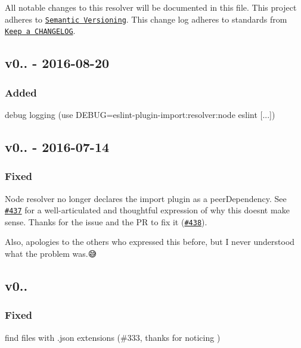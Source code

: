 All notable changes to this resolver will be documented in this file. This project adheres to \href{http://semver.org/}{\tt Semantic Versioning}. This change log adheres to standards from \href{http://keepachangelog.com}{\tt Keep a C\+H\+A\+N\+G\+E\+L\+OG}.

\subsection*{v0.. -\/ 2016-\/08-\/20}

\subsubsection*{Added}


\begin{DoxyItemize}
\item debug logging (use {\ttfamily D\+E\+B\+UG=eslint-\/plugin-\/import\+:resolver\+:node eslint \mbox{[}...\mbox{]}})
\end{DoxyItemize}

\subsection*{v0.. -\/ 2016-\/07-\/14}

\subsubsection*{Fixed}


\begin{DoxyItemize}
\item Node resolver no longer declares the import plugin as a {\ttfamily peer\+Dependency}. See \href{https://github.com/benmosher/eslint-plugin-import/issues/437}{\tt \#437} for a well-\/articulated and thoughtful expression of why this doesn\textquotesingle{}t make sense. Thanks \href{https://github.com/jasonkarns}{\tt } for the issue and the PR to fix it (\href{https://github.com/benmosher/eslint-plugin-import/pull/438}{\tt \#438}).

Also, apologies to the others who expressed this before, but I never understood what the problem was.\+😅
\end{DoxyItemize}

\subsection*{v0..}

\subsubsection*{Fixed}


\begin{DoxyItemize}
\item find files with {\ttfamily .json} extensions (\#333, thanks for noticing ) 
\end{DoxyItemize}